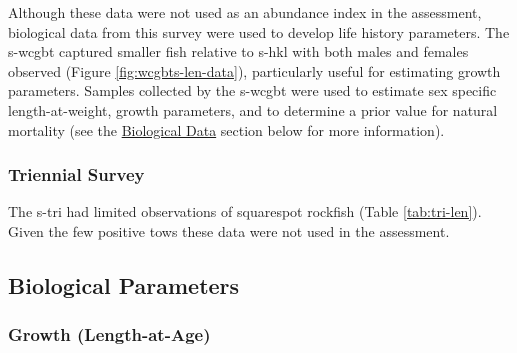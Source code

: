 \documentclass[11pt,
  english,
  a4paper,
]{article}
\begin{document}
\leavevmode\tagmcend\tagstructend\par


Although these data were not used as an abundance index in the assessment, biological data from this survey were used to develop life history parameters. The \gls{s-wcgbt} captured smaller fish relative to \gls{s-hkl} with both males and females observed (Figure \ref{fig:wcgbts-len-data}), particularly useful for estimating growth parameters. Samples collected by the \gls{s-wcgbt} were used to estimate sex specific length-at-weight, growth parameters, and to determine a prior value for natural mortality (see the {\protect\hyperlink{biological_data}{Biological Data}\leavevmode\tagmcend\tagstructend} section below for more information).

\leavevmode\tagmcend\tagstructend\par


\hypertarget{triennial-survey}{%
\subsubsection{Triennial Survey}\label{triennial-survey}}

\leavevmode\tagmcend\tagstructend


The \gls{s-tri} had limited observations of squarespot rockfish (Table \ref{tab:tri-len}). Given the few positive tows these data were not used in the assessment.

\leavevmode\tagmcend\tagstructend\par


\hypertarget{biological-parameters}{%
\subsection{Biological Parameters}\label{biological-parameters}}

\leavevmode\tagmcend\tagstructend


\hypertarget{growth-length-at-age}{%
\subsubsection{Growth (Length-at-Age)}\label{growth-length-at-age}}
\end{document}
